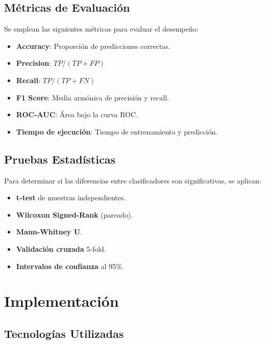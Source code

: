 \documentclass[conference]{IEEEtran}
\begin{document}
\subsection{Métricas de Evaluación}

Se emplean las siguientes métricas para evaluar el desempeño:

\begin{itemize}
    \item \textbf{Accuracy}: Proporción de predicciones correctas.
    \item \textbf{Precision}: $TP / (TP + FP)$
    \item \textbf{Recall}: $TP / (TP + FN)$
    \item \textbf{F1 Score}: Media armónica de precisión y recall.
    \item \textbf{ROC-AUC}: Área bajo la curva ROC.
    \item \textbf{Tiempo de ejecución}: Tiempo de entrenamiento y predicción.
\end{itemize}

\subsection{Pruebas Estadísticas}

Para determinar si las diferencias entre clasificadores son significativas, se 
aplican:
\begin{itemize}
    \item \textbf{t-test} de muestras independientes.
    \item \textbf{Wilcoxon Signed-Rank} (pareado).
    \item \textbf{Mann-Whitney U}.
    \item \textbf{Validación cruzada} 5-fold.
    \item \textbf{Intervalos de confianza} al 95\%.
\end{itemize}

\section{Implementación}
\label{sec:implementacion}

\subsection{Tecnologías Utilizadas}
\end{document}
